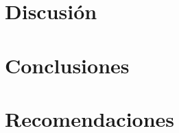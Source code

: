 \documentclass[10pt, letterpaper]{report}
\newcommand{\defaultparformat}[1]{
	{\setlength{\parskip}{2ex}
    }
}
\renewcommand\thechapter{\Roman{chapter}}
\begin{document}
\ifdefined\CAPdicusion
	\newpage
	\chapter{Discusión}
	\ifdefined\parpordefecto
    	\defaultparformat{Discusion}
    \else
    	
    \fi  
\fi

\ifdefined\CAPconclusiones
	\newpage
	\chapter{Conclusiones}
	\ifdefined\parpordefecto
		\defaultparformat{conclusiones}
	\else
		
	\fi
\fi

\ifdefined\CAPrecomendaciones
	\newpage
	\chapter{Recomendaciones}
	\ifdefined\parpordefecto
		\defaultparformat{recomendaciones}
	\else
		
	\fi
\fi

% 	





\ifdefined\CAPbibliografia
	\newpage
	\cleardoublepage{}
	\ifdefined\usarAPA
		
	\else
		
	\fi
	
\fi

%     	
\end{document}
